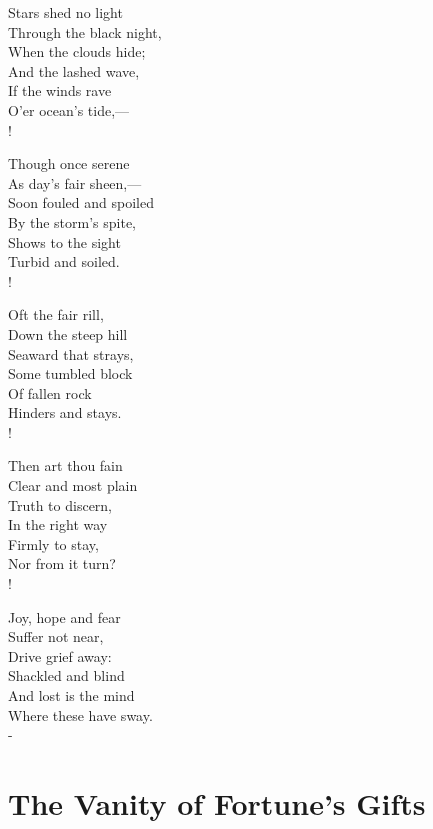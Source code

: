 \documentclass[12pt]{book}
\newenvironment{vpoem}[1]%
  {\def\poemvsindentlines{#1}\begin{poem}\small}%
  {\end{poem}\def\poemvsindentlines{\relax}}
\begin{document}
\begin{vpoem}{2356}
    Stars shed no light \\
      Through the black night, \\
        When the clouds hide; \\
    And the lashed wave, \\
      If the winds rave \\
        O'er ocean's tide,--- \\!

    Though once serene \\
      As day's fair sheen,--- \\
        Soon fouled and spoiled \\
    By the storm's spite, \\
      Shows to the sight \\
        Turbid and soiled. \\!

    Oft the fair rill, \\
      Down the steep hill \\
        Seaward that strays, \\
    Some tumbled block \\
      Of fallen rock \\
        Hinders and stays. \\!

    Then art thou fain \\
      Clear and most plain \\
        Truth to discern, \\
    In the right way \\
      Firmly to stay, \\
        Nor from it turn? \\!

    Joy, hope and fear \\
      Suffer not near, \\
        Drive grief away: \\
    Shackled and blind \\
      And lost is the mind \\
        Where these have sway. \\-
\end{vpoem}

\chapter{The Vanity of Fortune's Gifts}
\end{document}
